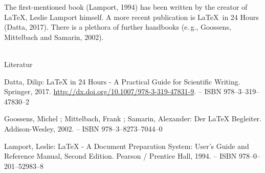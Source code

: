 The first-mentioned book (Lamport, 1994) has been written by the creator of \LaTeX{}, Leslie Lamport himself.
A more recent publication is \glqq{}\LaTeX\ in 24 Hours\grqq{} (Datta, 2017).
There is a plethora of further handbooks (e.\,g., Goossens, Mittelbach and Samarin, 2002).

~\\

\noindent Literatur

\noindent [Datta 2017] Datta, Dilip: LaTeX in 24 Hours - A Practical Guide for Scientific Writing. Springer, 2017. \url{http://dx.doi.org/10.1007/978-3-319-47831-9}. – ISBN 978–3–319–47830–2

\noindent [Goossens u. a. 2002] Goossens, Michel ; Mittelbach, Frank ; Samarin, Alexander: Der LaTeX Begleiter. Addison-Wesley, 2002. – ISBN 978–3–8273–7044–0

\noindent [Lamport 1994] Lamport, Leslie: LaTeX - A Document Preparation System: User’s Guide and Reference Manual, Second Edition. Pearson / Prentice Hall, 1994. – ISBN 978–0–201–52983–8

